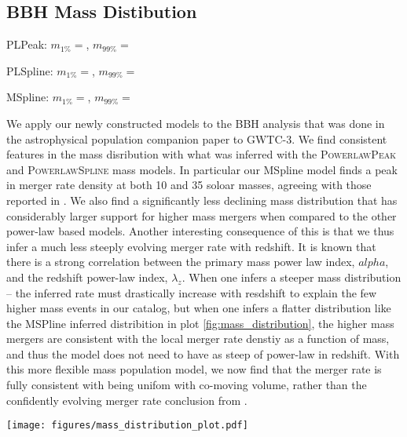 \subsection{BBH Mass Distibution} \label{sec:mass_dist}

PLPeak: $m_{1\%} = $\result{$\CIPlusMinus{\macros[MassDistribution][PLPeak][m_1percentile]}$}, $m_{99\%} = $\result{$\CIPlusMinus{\macros[MassDistribution][PLPeak][m_99percentile]}$}


PLSpline: $m_{1\%} = $\result{$\CIPlusMinus{\macros[MassDistribution][PLSpline][m_1percentile]}$}, $m_{99\%} = $\result{$\CIPlusMinus{\macros[MassDistribution][PLSpline][m_99percentile]}$}


MSpline: $m_{1\%} = $\result{$\CIPlusMinus{\macros[MassDistribution][MSpline][m_1percentile]}$}, $m_{99\%} = $\result{$\CIPlusMinus{\macros[MassDistribution][MSpline][m_99percentile]}$}

We apply our newly constructed models to the BBH analysis that was done in the astrophysical population companion paper to GWTC-3. 
We find consistent features in the mass disribution with what was inferred with the \textsc{PowerlawPeak} and \textsc{PowerlawSpline} 
mass models. In particular our MSpline model finds a peak in merger rate density at both 10 and 35 soloar masses, agreeing with those reported
in . We also find a significantly less declining mass distribution that has considerably larger support for higher mass 
mergers when compared to the other power-law based models. Another interesting consequence of this is that we thus infer a much less steeply
evolving merger rate with redshift. It is known that there is a strong correlation between the primary mass power law index, $alpha$, and the 
redshift power-law index, $\lambda_z$. When one infers a steeper mass distribution -- the inferred rate must drastically increase 
with resdshift to explain the few higher mass events in our catalog, but when one infers a flatter distribution like the MSPline inferred
distribition in plot \ref{fig:mass_distribution}, the higher mass mergers are consistent with the local merger rate denstiy as a function of mass, 
and thus the model does not need to have as steep of power-law in redshift. With this more flexible mass population model, we now 
find that the merger rate is fully consistent with being unifom with co-moving volume, rather than the confidently evolving merger rate 
conclusion from . 

\begin{figure*}[ht!]
    \begin{centering}
        \texttt{[image: figures/mass\_distribution\_plot.pdf]}
        \caption{Plot showing the primary mass distribution inferred with the \textsc{MSpline} model with 40 knots for $m_1$. We show the results for the 
        \textsc{PowerlawSpline} (blue) model from the LVK's GWTC-3 population analyses.}
        \label{fig:mass_distribution}
    \end{centering}
\end{figure*}


